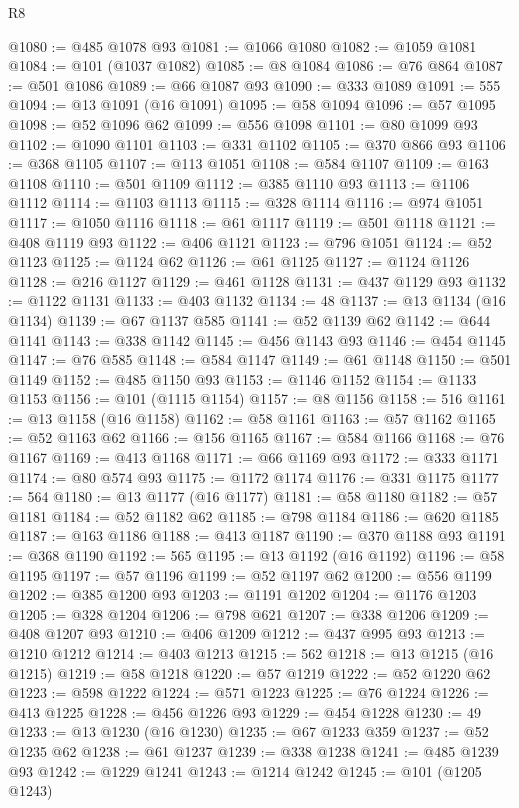 \begin{lexlean}{R8}
\begin{coremodule}
@1080 := @485 @1078 @93
@1081 := @1066 @1080
@1082 := @1059 @1081
@1084 := @101 (@1037 @1082)
@1085 := @8 @1084
@1086 := @76 @864
@1087 := @501 @1086
@1089 := @66 @1087 @93
@1090 := @333 @1089
@1091 := 555
@1094 := @13 @1091 (@16 @1091)
@1095 := @58 @1094
@1096 := @57 @1095
@1098 := @52 @1096 @62
@1099 := @556 @1098
@1101 := @80 @1099 @93
@1102 := @1090 @1101
@1103 := @331 @1102
@1105 := @370 @866 @93
@1106 := @368 @1105
@1107 := @113 @1051
@1108 := @584 @1107
@1109 := @163 @1108
@1110 := @501 @1109
@1112 := @385 @1110 @93
@1113 := @1106 @1112
@1114 := @1103 @1113
@1115 := @328 @1114
@1116 := @974 @1051
@1117 := @1050 @1116
@1118 := @61 @1117
@1119 := @501 @1118
@1121 := @408 @1119 @93
@1122 := @406 @1121
@1123 := @796 @1051
@1124 := @52 @1123
@1125 := @1124 @62
@1126 := @61 @1125
@1127 := @1124 @1126
@1128 := @216 @1127
@1129 := @461 @1128
@1131 := @437 @1129 @93
@1132 := @1122 @1131
@1133 := @403 @1132
@1134 := 48
@1137 := @13 @1134 (@16 @1134)
@1139 := @67 @1137 @585
@1141 := @52 @1139 @62
@1142 := @644 @1141
@1143 := @338 @1142
@1145 := @456 @1143 @93
@1146 := @454 @1145
@1147 := @76 @585
@1148 := @584 @1147
@1149 := @61 @1148
@1150 := @501 @1149
@1152 := @485 @1150 @93
@1153 := @1146 @1152
@1154 := @1133 @1153
@1156 := @101 (@1115 @1154)
@1157 := @8 @1156
@1158 := 516
@1161 := @13 @1158 (@16 @1158)
@1162 := @58 @1161
@1163 := @57 @1162
@1165 := @52 @1163 @62
@1166 := @156 @1165
@1167 := @584 @1166
@1168 := @76 @1167
@1169 := @413 @1168
@1171 := @66 @1169 @93
@1172 := @333 @1171
@1174 := @80 @574 @93
@1175 := @1172 @1174
@1176 := @331 @1175
@1177 := 564
@1180 := @13 @1177 (@16 @1177)
@1181 := @58 @1180
@1182 := @57 @1181
@1184 := @52 @1182 @62
@1185 := @798 @1184
@1186 := @620 @1185
@1187 := @163 @1186
@1188 := @413 @1187
@1190 := @370 @1188 @93
@1191 := @368 @1190
@1192 := 565
@1195 := @13 @1192 (@16 @1192)
@1196 := @58 @1195
@1197 := @57 @1196
@1199 := @52 @1197 @62
@1200 := @556 @1199
@1202 := @385 @1200 @93
@1203 := @1191 @1202
@1204 := @1176 @1203
@1205 := @328 @1204
@1206 := @798 @621
@1207 := @338 @1206
@1209 := @408 @1207 @93
@1210 := @406 @1209
@1212 := @437 @995 @93
@1213 := @1210 @1212
@1214 := @403 @1213
@1215 := 562
@1218 := @13 @1215 (@16 @1215)
@1219 := @58 @1218
@1220 := @57 @1219
@1222 := @52 @1220 @62
@1223 := @598 @1222
@1224 := @571 @1223
@1225 := @76 @1224
@1226 := @413 @1225
@1228 := @456 @1226 @93
@1229 := @454 @1228
@1230 := 49
@1233 := @13 @1230 (@16 @1230)
@1235 := @67 @1233 @359
@1237 := @52 @1235 @62
@1238 := @61 @1237
@1239 := @338 @1238
@1241 := @485 @1239 @93
@1242 := @1229 @1241
@1243 := @1214 @1242
@1245 := @101 (@1205 @1243)

\end{coremodule}
\end{lexlean}
